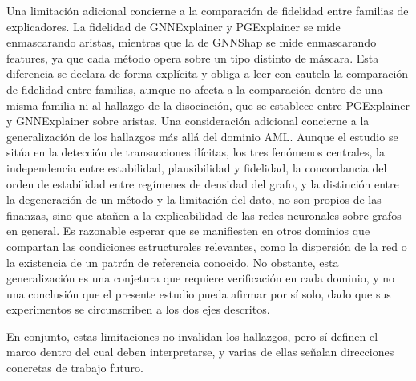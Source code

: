 Una limitación adicional concierne a la comparación de fidelidad entre familias de explicadores. La fidelidad de GNNExplainer y PGExplainer se mide enmascarando aristas, mientras que la de GNNShap se mide enmascarando features, ya que cada método opera sobre un tipo distinto de máscara. Esta diferencia se declara de forma explícita y obliga a leer con cautela la comparación de fidelidad entre familias, aunque no afecta a la comparación dentro de una misma familia ni al hallazgo de la disociación, que se establece entre PGExplainer y GNNExplainer sobre aristas. Una consideración adicional concierne a la generalización de los hallazgos más allá del dominio AML. Aunque el estudio se sitúa en la detección de transacciones ilícitas, los tres fenómenos centrales, la independencia entre estabilidad, plausibilidad y fidelidad, la concordancia del orden de estabilidad entre regímenes de densidad del grafo, y la distinción entre la degeneración de un método y la limitación del dato, no son propios de las finanzas, sino que atañen a la explicabilidad de las redes neuronales sobre grafos en general. Es razonable esperar que se manifiesten en otros dominios que compartan las condiciones estructurales relevantes, como la dispersión de la red o la existencia de un patrón de referencia conocido. No obstante, esta generalización es una conjetura que requiere verificación en cada dominio, y no una conclusión que el presente estudio pueda afirmar por sí solo, dado que sus experimentos se circunscriben a los dos ejes descritos.

En conjunto, estas limitaciones no invalidan los hallazgos, pero sí definen el marco dentro del cual deben interpretarse, y varias de ellas señalan direcciones concretas de trabajo futuro.
